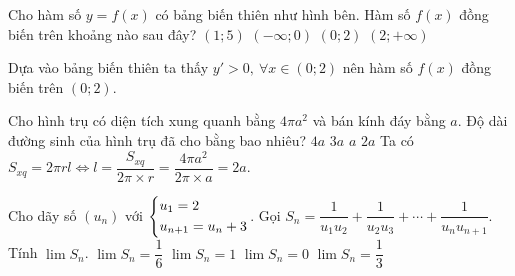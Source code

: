 \begin{ex}%
	\immini
	{
		Cho hàm số $y=f(x)$ có bảng biến thiên như hình bên. Hàm số $f(x)$ đồng biến trên khoảng nào sau đây?
		\choice
		{$(1;5)$}
		{$(-\infty;0)$}
		{\True $(0;2)$}
		{$(2;+\infty)$}
	}
	{
	}
	\loigiai
	{
		Dựa vào bảng biến thiên ta thấy $y'>0,~\forall x \in (0;2)$ nên hàm số $f(x)$ đồng biến trên $(0;2)$.
	}
\end{ex}

\begin{ex}%
	Cho hình trụ có diện tích xung quanh bằng $4\pi a^2$ và bán kính đáy bằng $a$. Độ dài đường sinh của hình trụ đã cho bằng bao nhiêu?
	\choice
	{$4a$}
	{$3a$}
	{$a$}
	{\True $2a$}
	\loigiai
	{
		Ta có $S_{xq}=2\pi rl \Leftrightarrow l=\dfrac{S_{xq}}{2\pi\times r}=\dfrac{4\pi a^2}{2\pi\times a}=2a.$
	}
\end{ex}
\begin{ex}%
	Cho dãy số $(u_n)$ với $\left\{\begin{aligned}&u_1=2\\&u_{n+1}=u_n+3\end{aligned}\right.$. Gọi $S_n=\dfrac{1}{u_1u_2}+\dfrac{1}{u_2u_3}+\cdots+\dfrac{1}{u_nu_{n+1}}$. Tính $\lim S_n$.
	\choice
	{\True $\lim S_n=\dfrac{1}{6}$}
	{$\lim S_n=1$}
	{$\lim S_n=0$}
	{$\lim S_n=\dfrac{1}{3}$}
\end{ex}

